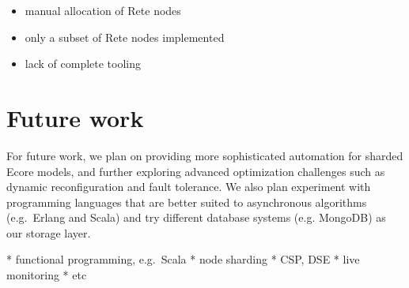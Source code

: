 \begin{itemize}
  \item manual allocation of Rete nodes
  \item only a subset of Rete nodes implemented 
  \item lack of complete tooling   
\end{itemize}

\section{Future work}
\label{sec:future-work}

For future work, we plan on providing more sophisticated automation for sharded Ecore models, and further exploring advanced optimization challenges such as dynamic reconfiguration and fault tolerance.
We also plan experiment with programming languages that are better suited to asynchronous algorithms (e.g.\ Erlang and Scala) and try different database systems (e.g. MongoDB) as our storage layer.

* functional programming, e.g.\ Scala
* node sharding
* CSP, DSE
* live monitoring
* etc

